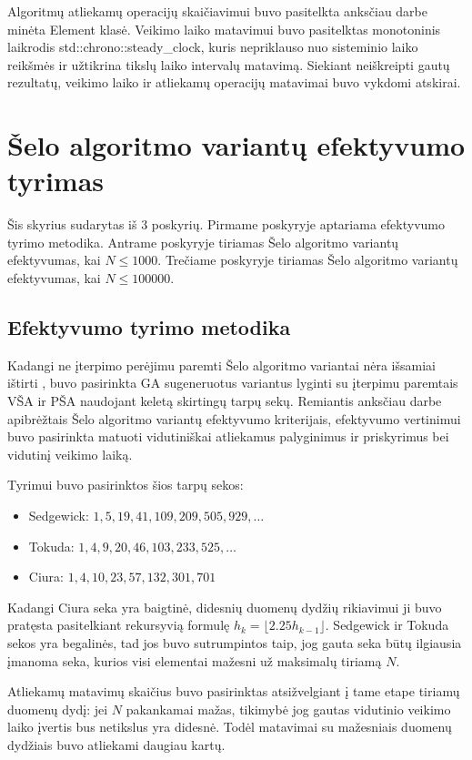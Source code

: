 \documentclass{VUMIFInfKursinis}
\begin{document}
Algoritmų atliekamų operacijų skaičiavimui buvo pasitelkta anksčiau darbe minėta Element klasė.
Veikimo laiko matavimui buvo pasitelktas monotoninis laikrodis std::chrono::steady\_clock, kuris nepriklauso nuo sisteminio laiko reikšmės
ir užtikrina tikslų laiko intervalų matavimą.
Siekiant neiškreipti gautų rezultatų, veikimo laiko ir atliekamų operacijų matavimai buvo vykdomi atskirai.

\section{Šelo algoritmo variantų efektyvumo tyrimas}

Šis skyrius sudarytas iš 3 poskyrių.
Pirmame poskyryje aptariama efektyvumo tyrimo metodika.
Antrame poskyryje tiriamas Šelo algoritmo variantų efektyvumas, kai $N \leq 1000$.
Trečiame poskyryje tiriamas Šelo algoritmo variantų efektyvumas, kai $N \leq 100000$.

\subsection{Efektyvumo tyrimo metodika}

Kadangi ne įterpimo perėjimu paremti Šelo algoritmo variantai nėra išsamiai ištirti \cite{brejova2001analyzing},
buvo pasirinkta GA sugeneruotus variantus lyginti su įterpimu paremtais VŠA ir PŠA naudojant keletą skirtingų tarpų sekų.
Remiantis anksčiau darbe apibrėžtais Šelo algoritmo variantų efektyvumo kriterijais,
efektyvumo vertinimui buvo pasirinkta matuoti vidutiniškai atliekamus palyginimus ir priskyrimus bei vidutinį veikimo laiką.  

Tyrimui buvo pasirinktos šios tarpų sekos:
\begin{itemize}
  \item Sedgewick: $1, 5, 19, 41, 109, 209, 505, 929, \ldots$ \cite{SEDGEWICK1986159}
  \item Tokuda: $1, 4, 9, 20, 46, 103, 233, 525, \ldots $ \cite{10.5555/645569.659879}
  \item Ciura: $1, 4, 10, 23, 57, 132, 301, 701$ \cite{ciura2001best}
\end{itemize}
Kadangi Ciura seka yra baigtinė, didesnių duomenų dydžių rikiavimui ji buvo pratęsta pasitelkiant rekursyvią formulę $h_{k}=\lfloor 2.25h_{k-1}\rfloor$.
Sedgewick ir Tokuda sekos yra begalinės, tad jos buvo sutrumpintos taip, jog gauta seka būtų ilgiausia įmanoma seka, kurios visi elementai mažesni už maksimalų tiriamą $N$.

Atliekamų matavimų skaičius buvo pasirinktas atsižvelgiant į tame etape tiriamų duomenų dydį: jei $N$ pakankamai mažas,
tikimybė jog gautas vidutinio veikimo laiko įvertis bus netikslus yra didesnė.
Todėl matavimai su mažesniais duomenų dydžiais buvo atliekami daugiau kartų.
\end{document}
